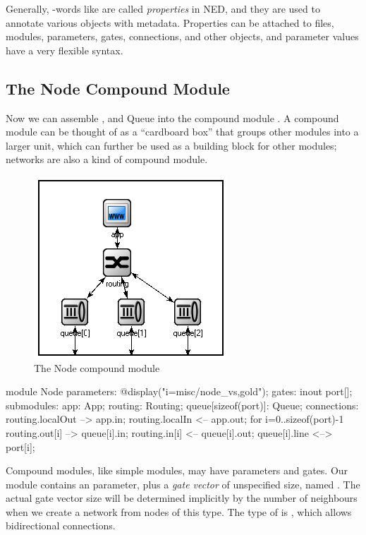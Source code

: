 Generally, -words like  are called \textit{properties}
in NED, and they are used to annotate various objects
with metadata. Properties can be attached to files, modules, parameters, gates,
connections, and other objects, and parameter values have a very flexible
syntax.


\subsection{The Node Compound Module}

Now we can assemble ,  and {Queue} into the
compound module . A compound module can be thought of as
a ``cardboard box'' that groups other modules into a larger unit,
which can further be used as a building block for other modules;
networks are also a kind of compound module.

\begin{figure}[htbp]
  \centering
  \includegraphics[scale=0.6]{figures/ned-routing-node}
  \caption{The Node compound module}
  \label{fig:ned-routing-node}
\end{figure}

\begin{ned}
module Node
{
    parameters:
        @display("i=misc/node_vs,gold");
    gates:
        inout port[];
    submodules:
        app: App;
        routing: Routing;
        queue[sizeof(port)]: Queue;
    connections:
        routing.localOut --> app.in;
        routing.localIn <-- app.out;
        for i=0..sizeof(port)-1 {
            routing.out[i] --> queue[i].in;
            routing.in[i] <-- queue[i].out;
            queue[i].line <--> port[i];
        }
}
\end{ned}

Compound modules, like simple modules, may have parameters and gates.
Our  module contains an  parameter, plus a
\textit{gate vector} of unspecified size, named .
The actual gate vector size will be determined implicitly by the number
of neighbours when we create a network from nodes of this type.
The type of  is , which allows bidirectional
connections.


